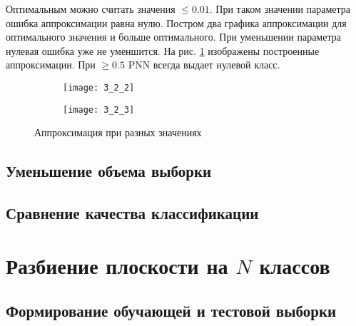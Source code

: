 Оптимальным можно считать значения  $\leq 0.01$. При таком значении параметра ошибка аппроксимации равна нулю. Постром два графика аппроксимации для оптимального значения  и больше оптимального. При уменьшении параметра нулевая ошибка уже не уменшится. На рис. \ref{fig:3_2_2} изображены построенные аппроксимации. При  $\geq 0.5$ PNN всегда выдает нулевой класс.
\begin{figure}[H]
\begin{center}
	\begin{subfigure}{0.49\textwidth}
		\texttt{[image: 3\_2\_2]}
		\caption{}
	\end{subfigure}
	\begin{subfigure}{0.49\textwidth}
		\texttt{[image: 3\_2\_3]}
		\caption{}
	\end{subfigure}
	\caption{Аппроксимация при разных значениях }
	\label{fig:3_2_2}
\end{center}
\end{figure}

\subsection{Уменьшение объема выборки}


\subsection{Сравнение качества классификации}


\newpage

\section{Разбиение плоскости на $N$ классов}

\subsection{Формирование обучающей и тестовой выборки}

